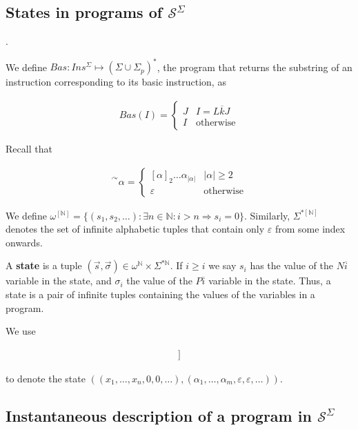 \documentclass[a4paper, 12pt]{article}
\begin{document}
\subsection{States in programs of $\mathcal{S}^{\Sigma}$}.

We define $Bas : Ins^{\Sigma} \mapsto (\Sigma \cup \Sigma_p)^{*}$, the program
that returns the substring of an instruction corresponding to its basic
instruction, as 

\begin{align*}
    Bas(I) = \begin{cases}
        J & I = L \overline{k} J \\ 
        I & \text{otherwise}
    \end{cases}
\end{align*}

Recall that 

\begin{align*}
    {}^{\curvearrowright} \alpha = \begin{cases}
        [\alpha]_2 \ldots \alpha_|\alpha| & |\alpha| \geq 2 \\ 
        \varepsilon & \text{otherwise}
    \end{cases}
\end{align*}

We define $\omega^{[ \mathbb{N} ]} = \{ (s_1, s_2, \ldots) : \exists n \in
\mathbb{N} : i > n \Rightarrow s_i = 0 \}$. Similarly, $\Sigma^{*[ \mathbb{N} ]}$ denotes the set of infinite alphabetic
tuples that contain only $\varepsilon$ from some index onwards.

A \textbf{state} is a tuple $(\overrightarrow{s}, \overrightarrow{\sigma}) \in
\omega^{\mathbb{N}} \times \Sigma^{*\mathbb{N}}$. If $i \geq i$ we say $s_i$ has
the value of the ${N} \overline{i}$ variable in the state, and $\sigma_i$ the
value of the $P \overline{i}$ variable in the state. Thus, a state is a pair of
infinite tuples containing the values of the variables in a program.

We use 

\begin{align*}
    [\![ x_1, \ldots x_n, ~ \alpha_1, \ldots, \alpha_m ]\!]
\end{align*}

to denote the state $\left( (x_1, \ldots, x_n, 0, 0, \ldots), (\alpha_1, \ldots,
\alpha_m, \varepsilon, \varepsilon,\ldots) \right) $.

\subsection{Instantaneous description of a program in $\mathcal{S}^{\Sigma}$}
\end{document}
